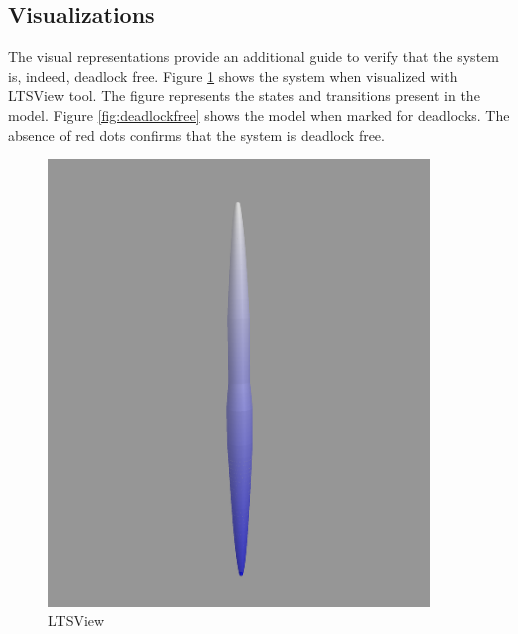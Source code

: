 \documentclass[a4paper,12pt]{article}
\begin{document}
	\subsection{Visualizations}
	The visual representations provide an additional guide to verify that the system is, indeed, deadlock free. Figure \ref{fig:ltsview-1} shows the system when visualized with LTSView tool. The figure represents the states and transitions present in the model. Figure \ref{fig:deadlockfree} shows the model when marked for deadlocks. The absence of red dots confirms that the system is deadlock free.
	\begin{figure}[ht]
		\centering
		\begin{minipage}{0.45\textwidth}
			\centering
			\includegraphics[width=0.9\textwidth]{3D-Model.png} \caption{LTSView}
			\label{fig:ltsview-1}
		\end{minipage}\hfill
		\begin{minipage}{0.45\textwidth}
			\centering

\end{minipage}
\end{figure}
\end{document}
